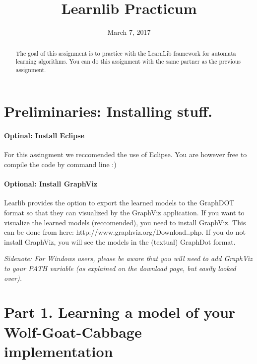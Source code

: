 \documentclass[a4paper]{article}
\title{Learnlib Practicum}
\date{March 7, 2017}
\newcommand{\deadline}{\emph{February 16, 2016, 8:45 hours}\xspace}
\begin{document}
\maketitle

\begin{abstract}
The goal of this assignment is to practice with the LearnLib framework for automata learning algorithms.
You can do this assignment with the same partner as the previous assignment.

\end{abstract}

\section*{Preliminaries: Installing stuff.}

\paragraph{Optinal: Install Eclipse}
For this assingment we reccomended the use of Eclipse. You are however free to compile the code by command line :)

\paragraph{Optional: Install GraphViz}
Learlib provides the option to export the learned models to the GraphDOT format so that they can visualized by the GraphViz application. If you want to visualize the learned models (reccomended), you need to install GraphViz. This can be done from here: http://www.graphviz.org/Download..php. If you do not install GraphViz, you will see the models in the (textual) GraphDot format.

\emph{Sidenote: For Windows users, please be aware that you will need to add GraphViz to your PATH variable (as explained on the download page, but easily looked over).}

\section*{Part 1. Learning a model of your Wolf-Goat-Cabbage implementation}
\end{document}
